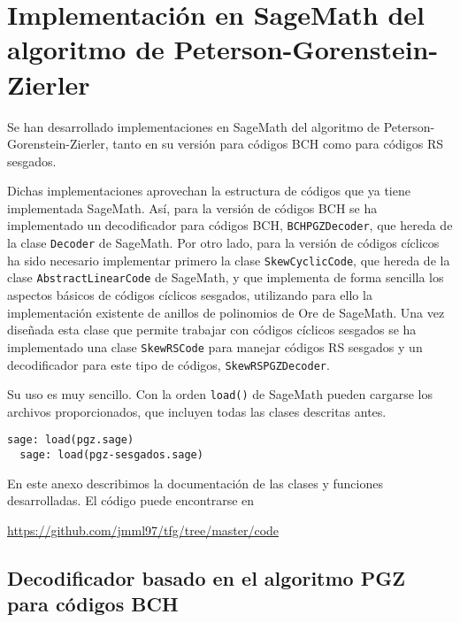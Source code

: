 \chapter[Implementación en SageMath del algoritmo PGZ]{Implementación en SageMath del algoritmo de Peterson-Gorenstein-Zierler}
\label{annex:pgz-sage}

Se han desarrollado implementaciones en SageMath del algoritmo de Peterson-Gorenstein-Zierler, tanto en su versión para códigos BCH como para códigos RS sesgados.

Dichas implementaciones aprovechan la estructura de códigos que ya tiene implementada SageMath.
Así, para la versión de códigos BCH se ha implementado un decodificador para códigos BCH, \texttt{BCHPGZDecoder}, que hereda de la clase \texttt{Decoder} de SageMath.
Por otro lado, para la versión de códigos cíclicos ha sido necesario implementar primero la clase \texttt{SkewCyclicCode}, que hereda de la clase \texttt{AbstractLinearCode} de SageMath, y que implementa de forma sencilla los aspectos básicos de códigos cíclicos sesgados, utilizando para ello la implementación existente de anillos de polinomios de Ore de SageMath.
Una vez diseñada esta clase que permite trabajar con códigos cíclicos sesgados se ha implementado una clase \texttt{SkewRSCode} para manejar códigos RS sesgados y un decodificador para este tipo de códigos, \texttt{SkewRSPGZDecoder}.

Su uso es muy sencillo.
Con la orden \texttt{load()} de SageMath pueden cargarse los archivos proporcionados, que incluyen todas las clases descritas antes.

\begin{lstlisting}[gobble=2]
  sage: load(pgz.sage)
  sage: load(pgz-sesgados.sage)
\end{lstlisting}

En este anexo describimos la documentación de las clases y funciones desarrolladas.
El código puede encontrarse en
\begin{center}
  \url{https://github.com/jmml97/tfg/tree/master/code}
\end{center}

\section{Decodificador basado en el algoritmo PGZ para códigos BCH}


